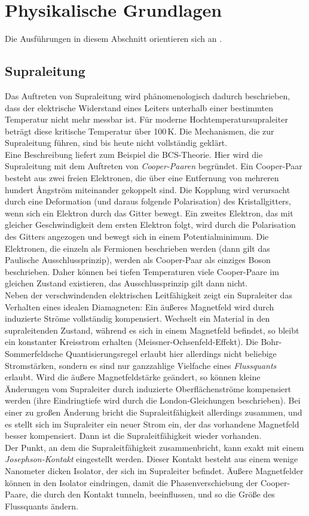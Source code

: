 \section{Physikalische Grundlagen}
Die Ausführungen in diesem Abschnitt orientieren sich an \cite{manual}.
\subsection{Supraleitung}
Das Auftreten von Supraleitung wird phänomenologisch dadurch beschrieben,
dass der elektrische Widerstand eines Leiters unterhalb einer bestimmten Temperatur nicht mehr
messbar ist. Für moderne Hochtemperatursupraleiter beträgt diese kritische Temperatur über 100\,K.
Die Mechanismen, die zur Supraleitung führen, sind bis heute nicht vollständig geklärt.\\
Eine Beschreibung liefert zum Beispiel die BCS-Theorie.
Hier wird die Supraleitung mit dem Auftreten von \emph{Cooper-Paaren} begründet.
Ein Cooper-Paar besteht aus zwei freien Elektronen, die über eine Entfernung von mehreren hundert Ångström
miteinander gekoppelt sind.
Die Kopplung wird verursacht durch eine Deformation (und daraus folgende Polarisation) des Kristallgitters,
wenn sich ein Elektron durch das Gitter bewegt. Ein zweites Elektron, das mit gleicher Geschwindigkeit
dem ersten Elektron folgt, wird durch die Polarisation des Gitters angezogen und bewegt sich
in einem Potentialminimum.
Die Elektronen, die einzeln als Fermionen beschrieben werden (dann gilt das Paulische Ausschlussprinzip),
werden als Cooper-Paar als einziges Boson beschrieben.
Daher können bei tiefen Temperaturen viele Cooper-Paare im gleichen Zustand existieren,
das Ausschlussprinzip gilt dann nicht.\\
Neben der verschwindenden elektrischen Leitfähigkeit zeigt ein Supraleiter das Verhalten eines idealen Diamagneten:
Ein äußeres Magnetfeld wird durch induzierte Ströme vollständig kompensiert.
Wechselt ein Material in den supraleitenden Zustand, während es sich in einem Magnetfeld befindet,
so bleibt ein konstanter Kreisstrom erhalten (Meissner-Ochsenfeld-Effekt).
Die Bohr-Sommerfeldsche Quantisierungsregel erlaubt hier allerdings nicht beliebige Stromstärken,
sondern es sind nur ganzzahlige Vielfache eines \emph{Flussquants} erlaubt.
Wird die äußere Magnetfeldstärke geändert,
so können kleine Änderungen vom Supraleiter durch induzierte Oberflächenströme kompensiert werden
(ihre Eindringtiefe wird durch die London-Gleichungen beschrieben).
Bei einer zu großen Änderung bricht die Supraleitfähigkeit allerdings zusammen,
und es stellt sich im Supraleiter ein neuer Strom ein, der das vorhandene Magnetfeld besser kompensiert.
Dann ist die Supraleitfähigkeit wieder vorhanden.\\
Der Punkt, an dem die Supraleitfähigkeit zusammenbricht, kann exakt mit einem \emph{Jo\-seph\-son-Kontakt}
eingestellt werden. Dieser Kontakt besteht aus einem wenige Nanometer dicken Isolator,
der sich im Supraleiter befindet.
Äußere Magnetfelder können in den Isolator eindringen, damit die Phasenverschiebung der Cooper-Paare,
die durch den Kontakt tunneln, beeinflussen, und so die Größe des Flussquants ändern.


